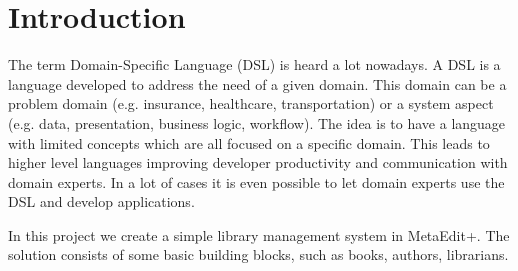 \section{Introduction}
The term Domain-Specific Language (DSL) is heard a lot nowadays. A DSL is a language developed to address the need of a given domain. This domain can be a problem domain (e.g. insurance, healthcare, transportation) or a system aspect (e.g. data, presentation, business logic, workflow). The idea is to have a language with limited concepts which are all focused on a specific domain. This leads to higher level languages improving developer productivity and communication with domain experts. In a lot of cases it is even possible to let domain experts use the DSL and develop applications.

In this project we create a simple library management system in MetaEdit+. The solution consists of some basic building blocks, such as books, authors, librarians. 